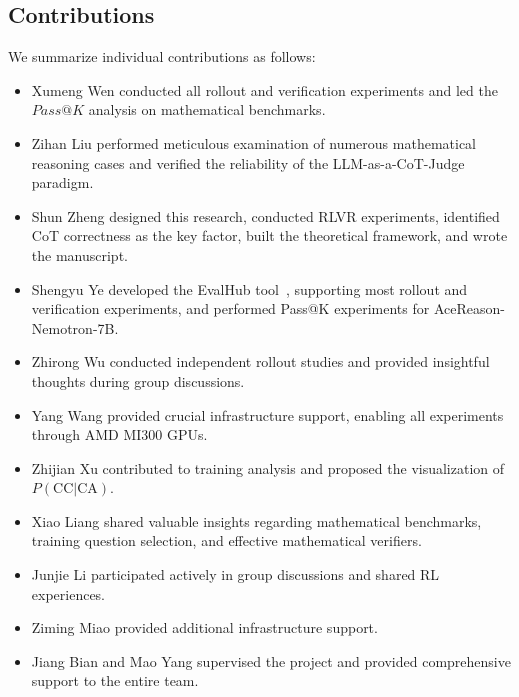 \subsection{Contributions}
\label{supp_sec:contributions}

We summarize individual contributions as follows:

\begin{itemize}
    \item Xumeng Wen conducted all rollout and verification experiments and led the $Pass@K$ analysis on mathematical benchmarks.
    
    \item Zihan Liu performed meticulous examination of numerous mathematical reasoning cases and verified the reliability of the LLM-as-a-CoT-Judge paradigm.
    
    \item Shun Zheng designed this research, conducted RLVR experiments, identified CoT correctness as the key factor, built the theoretical framework, and wrote the manuscript.
    
    \item Shengyu Ye developed the EvalHub tool~\citep{ye2025evalhub}, supporting most rollout and verification experiments, and performed Pass@K experiments for AceReason-Nemotron-7B.
    
    \item Zhirong Wu conducted independent rollout studies and provided insightful thoughts during group discussions.
    
    \item Yang Wang provided crucial infrastructure support, enabling all experiments through AMD MI300 GPUs.
    
    \item Zhijian Xu contributed to training analysis and proposed the visualization of $P(\text{CC}|\text{CA})$.
    
    \item Xiao Liang shared valuable insights regarding mathematical benchmarks, training question selection, and effective mathematical verifiers.
    
    \item Junjie Li participated actively in group discussions and shared RL experiences.
    
    \item Ziming Miao provided additional infrastructure support.
    
    \item Jiang Bian and Mao Yang supervised the project and provided comprehensive support to the entire team.
\end{itemize}